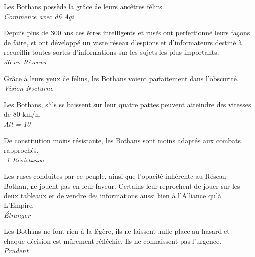 \begin{description}[align=left]
\item [Agilité du Félin] 			%
		Les Bothans possède la grâce de leurs ancêtres félins.\\
		\textit{Commence avec d6 Agi}

\item [Service de renseignement] 	%
		Depuis plus de 300 ans ces êtres intelligents et rusés ont perfectionné leurs façons de faire, et ont développé un vaste réseau d’espions et d’informateurs destiné à recueillir toutes sortes d’informations sur les sujets les plus importants.\\
		\textit{d6 en Réseaux}

\item [Comme en plein jour] 		%
		Grâce à leurs yeux de félins, les Bothans voient parfaitement dans l’obscurité.\\
		\textit{Vision Nocturne}

\item [Déplacement rapide] 			%
		Les Bothans, s’ils se baissent sur leur quatre pattes peuvent atteindre des vitesses de 80 km/h.\\
		\textit{All = 10}

\item [Frêle] 						%
		De constitution moins résistante, les Bothans sont moins adaptés aux combats rapprochés.\\
		\textit{-1 Résistance}

\item [Mauvaise réputation] 		%
		Les ruses conduites par ce peuple, ainsi que l’opacité inhérente au Réseau Bothan, ne jouent pas en leur faveur. Certains leur reprochent de jouer sur les deux tableaux et de vendre des informations aussi bien à l’Alliance qu’à L’Empire.\\
		\textit{\'Etranger}

\item [Prudent] 					%
		Les Bothans ne font rien à la légère, ils ne laissent nulle place au hasard et chaque décision est mûrement réfléchie. Ils ne connaissent pas l’urgence.\\
		\textit{Prudent}
\end{description}
